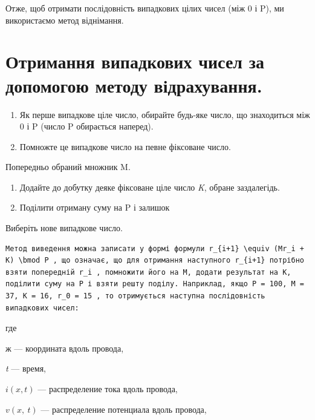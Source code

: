 \documentclass[
  ukrainian,
]{article}
\begin{document}
Отже, щоб отримати послідовність випадкових цілих чисел (між 0 і P), ми
використаємо метод віднімання.

\section{Отримання випадкових чисел за допомогою методу
відрахування.}\label{ux43eux442ux440ux438ux43cux430ux43dux43dux44f-ux432ux438ux43fux430ux434ux43aux43eux432ux438ux445-ux447ux438ux441ux435ux43b-ux437ux430-ux434ux43eux43fux43eux43cux43eux433ux43eux44e-ux43cux435ux442ux43eux434ux443-ux432ux456ux434ux440ux430ux445ux443ux432ux430ux43dux43dux44f.}

\begin{enumerate}
\def\labelenumi{\arabic{enumi}.}
\item
  Як перше випадкове ціле число, обирайте будь-яке число, що знаходиться
  між 0 і P (число P обирається наперед).
\item
  Помножте це випадкове число на певне фіксоване число.
\end{enumerate}

Попередньо обраний множник M.

\begin{enumerate}
\def\labelenumi{\arabic{enumi}.}
\setcounter{enumi}{2}
\item
  Додайте до добутку деяке фіксоване ціле число \emph{K}, обране
  заздалегідь.
\item
  Поділити отриману суму на P і залишок
\end{enumerate}

Виберіть нове випадкове число.

\begin{verbatim}
Метод виведення можна записати у формі формули r_{i+1} \equiv (Mr_i + K) \bmod P , що означає, що для отримання наступного r_{i+1} потрібно взяти попередній r_i , помножити його на M, додати результат на K, поділити суму на P і взяти решту поділу. Наприклад, якщо P = 100, M = 37, K = 16, r_0 = 15 , то отримується наступна послідовність випадкових чисел:
\end{verbatim}

где

ж --- координата вдоль провода,

\emph{t} --- время,

\(i(x, t)\) --- распределение тока вдоль провода,

\(v\left(x,\ t\right)\) --- распределение потенциала вдоль провода,
\end{document}
